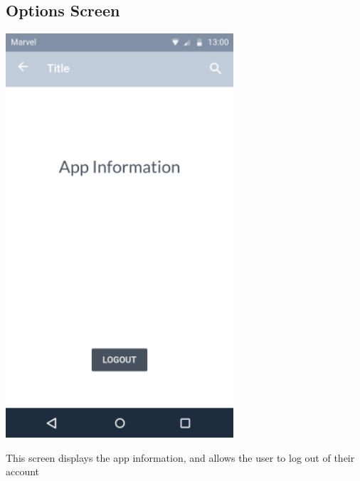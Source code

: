 \documentclass{report}
\begin{document}
\subsection{Options Screen}
\begin{center}
    \includegraphics[scale=0.5]{design-options}
\end{center}
This screen displays the app information, and allows the user to log out of their account

\newpage
\end{document}
